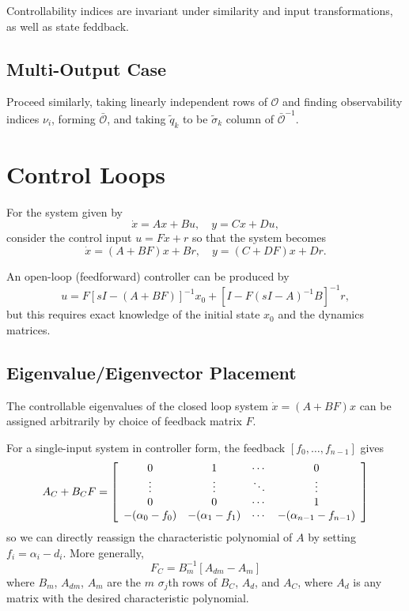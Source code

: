 \documentclass{article}
\begin{document}
Controllability indices are invariant under similarity and input
transformations, as well as state feddback.

\subsection{Multi-Output Case}
Proceed similarly, taking linearly independent rows of $\mathcal{O}$
and finding observability indices $\nu_i$, forming $\bar{\mathcal{O}}$,
and taking $\tilde{q}_k$ to be
$\tilde{\sigma}_k$ column of $\bar{\mathcal{O}}^{-1}$.

\section{Control Loops}
For the system given by
$$
\dot{x} = Ax + Bu, \quad
y = Cx + Du,
$$
consider the control input $u = Fx + r$
so that the system becomes
$$
\dot{x} = (A + BF)x + Br, \quad
y = (C + DF) x + Dr.
$$

An open-loop (feedforward) controller can be produced by
$$
u = F[sI - (A + BF)]^{-1} x_0 + [I - F(sI - A)^{-1} B]^{-1} r,
$$
but this requires exact knowledge of the initial state $x_0$ and the
dynamics matrices.

\subsection{Eigenvalue/Eigenvector Placement}
The controllable eigenvalues of the closed loop system
$\dot{x} = (A + BF)x$ can be assigned arbitrarily by choice of
feedback matrix $F$.

For a single-input system in controller form, the feedback
$[f_0, \dots, f_{n-1}]$ gives
$$
A_C + B_C F =
\left[\begin{array}{c c c c}
   0                & 1                 & \cdots & 0      \\
   \vdots           & \vdots            & \ddots & \vdots \\
   0                & 0                 & \cdots & 1      \\
  -(\alpha_0 - f_0) &  -(\alpha_1 - f_1) & \cdots & -(\alpha_{n-1} - f_{n-1})
\end{array}\right]
$$
so we can directly reassign the characteristic polynomial of $A$ by
setting $f_i = \alpha_i - d_i$. More generally,
$$
F_C = B_m^{-1} [ A_{dm} - A_m ]
$$
where $B_m$, $A_{dm}$, $A_m$ are the $m$ $\sigma_j$th rows of $B_C$,
$A_d$, and $A_C$, where $A_d$ is any matrix with the desired
characteristic polynomial.
\end{document}
